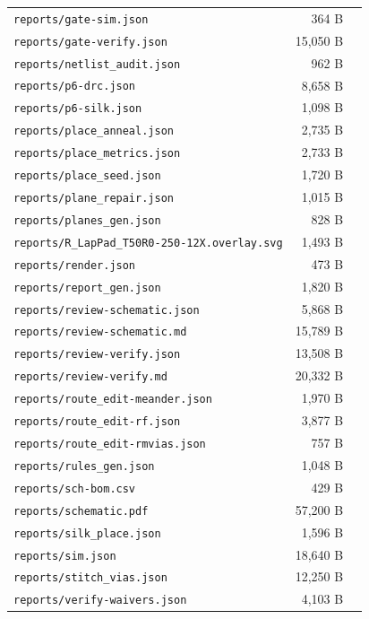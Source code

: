 \documentclass[11pt,a4paper]{article}
\begin{document}
{\begin{longtable}{p{9cm}rp{4cm}}
\texttt{reports/gate-sim.json} & 364 B &  \\
\texttt{reports/gate-verify.json} & 15,050 B &  \\
\texttt{reports/netlist\_audit.json} & 962 B &  \\
\texttt{reports/p6-drc.json} & 8,658 B &  \\
\texttt{reports/p6-silk.json} & 1,098 B &  \\
\texttt{reports/place\_anneal.json} & 2,735 B &  \\
\texttt{reports/place\_metrics.json} & 2,733 B &  \\
\texttt{reports/place\_seed.json} & 1,720 B &  \\
\texttt{reports/plane\_repair.json} & 1,015 B &  \\
\texttt{reports/planes\_gen.json} & 828 B &  \\
\texttt{reports/R\_LapPad\_T50R0-250-12X.overlay.svg} & 1,493 B &  \\
\texttt{reports/render.json} & 473 B &  \\
\texttt{reports/report\_gen.json} & 1,820 B &  \\
\texttt{reports/review-schematic.json} & 5,868 B &  \\
\texttt{reports/review-schematic.md} & 15,789 B &  \\
\texttt{reports/review-verify.json} & 13,508 B &  \\
\texttt{reports/review-verify.md} & 20,332 B &  \\
\texttt{reports/route\_edit-meander.json} & 1,970 B &  \\
\texttt{reports/route\_edit-rf.json} & 3,877 B &  \\
\texttt{reports/route\_edit-rmvias.json} & 757 B &  \\
\texttt{reports/rules\_gen.json} & 1,048 B &  \\
\texttt{reports/sch-bom.csv} & 429 B &  \\
\texttt{reports/schematic.pdf} & 57,200 B &  \\
\texttt{reports/silk\_place.json} & 1,596 B &  \\
\texttt{reports/sim.json} & 18,640 B &  \\
\texttt{reports/stitch\_vias.json} & 12,250 B &  \\
\texttt{reports/verify-waivers.json} & 4,103 B &  \\
\bottomrule
\end{longtable}
}
\end{document}
